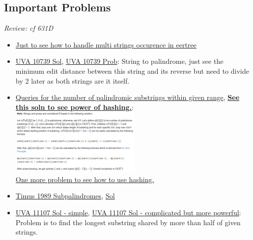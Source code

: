 \documentclass[8pt, a4paper, oneside, twocolumn]{extarticle}
\begin{document}
\subsection{Important Problems}
\textit{Review: cf 631D}
\begin{itemize}
    \item \href{https://github.com/sourabh2311/Timus/blob/master/2059_Not_common_palindromes.cpp}{Just to see how to handle multi strings occurence in eertree}
	\item \href {https://github.com/sourabh2311/Competitive-Programming/blob/master/UVA_10739.cpp}{UVA 10739 Sol}, \href {https://uva.onlinejudge.org/external/107/10739.pdf}{UVA 10739 Prob}: String to palindrome, just see the minimum edit distance between this string and its reverse but need to divide by 2 later as both strings are it itself.	
	\item \href {https://codeforces.com/contest/245/problem/H}{Queries for the number of palindromic substrings within given range}, \href {https://github.com/sourabh2311/Competitive-Programming/blob/master/IMP%20QUES/Suffix%20String%20Structure/Hash/245H%20-%20Queries%20for%20Number%20of%20Palindromes.cpp}{\textbf {See this soln to see power of hashing.}}: 
    \\\includegraphics[width=0.5\textwidth,height=0.5\textheight,keepaspectratio]{palsub} 	
    \\\href {https://github.com/sourabh2311/Competitive-Programming/blob/master/IMP%20QUES/Suffix%20String%20Structure/Hash/514C%20-%20Watto%20And%20Mechanism.cpp}{One more problem to see how to use hashing.}
    \item \href{http://acm.timus.ru/problem.aspx?space=1&num=1989}{Timus 1989 Subpalindromes}, \href{https://github.com/sourabh2311/Competitive-Programming/blob/master/timus/1989.cpp}{Sol}
	\item \href {https://github.com/sourabh2311/Competitive-Programming/blob/master/HimanshuSA11107.cpp}{UVA 11107 Sol - simple}, \href {https://github.com/sourabh2311/Competitive-Programming/blob/master/HimanshuSA11107.cpp}{UVA 11107 Sol - complicated but more powerful}: Problem is to find the longest substring shared by more than half of given strings.	
\end{itemize}
\end{document}
